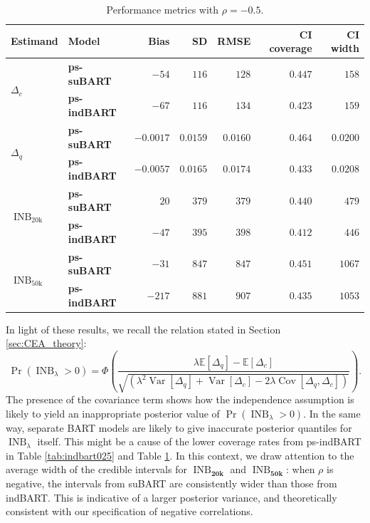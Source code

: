 \documentclass[aoas,preprint]{imsart}
\theoremstyle{plain}
\theoremstyle{definition}
\theoremstyle{remark}
\begin{document}
\begin{appendix}
\begin{table}[H]
\caption{Performance metrics with $\rho = -0.5$.\label{tab:indbart05}}
\setlength{\tabcolsep}{3.75pt}
\begin{tabular}{ll|rrrrr}
\textbf{Estimand} & \textbf{Model} & Bias & SD & RMSE & CI coverage & CI width \\
\hline
\multirow{2}{*}{$\Delta_c$} & \textbf{ps-suBART} & $-54$& $116$& $128$& $0.447$& $158$ \\
 & \textbf{ps-indBART} & $-67$& $116$& $134$& $0.423$& $159$ \\
\multirow{2}{*}{$\Delta_q$} & \textbf{ps-suBART} &$-0.0017$& $0.0159$& $0.0160$& $0.464$& $0.0200$ \\
 & \textbf{ps-indBART} & $-0.0057$& $0.0165$& $0.0174$& $0.433$& $0.0208$\\
\multirow{2}{*}{$\operatorname{INB}_{\mathrm{20k}}$} & \textbf{ps-suBART} & $20$& $379$& $379$& $0.440$& $479$ \\
& \textbf{ps-indBART} & $-47$& $395$& $398$& $0.412$& $446$ \\
\multirow{2}{*}{$\operatorname{INB}_{\mathrm{50k}}$} & \textbf{ps-suBART} & $-31$ & $847$& $847$& $0.451$& $1067$ \\
& \textbf{ps-indBART} & $-217$& $881$& $907$& $0.435$& $1053$
\end{tabular}
\end{table}%
In light of these results, we recall the relation stated in Section \ref{sec:CEA_theory}: 
\[
\Pr\left(\operatorname{INB}_{\lambda} > 0\right) = \Phi \left(\!\frac{\lambda \mathbb{E} \left\lbrack \Delta_q \right\rbrack - \mathbb{E} \left\lbrack \Delta_c \right\rbrack}{\sqrt{\left(\lambda^2 \operatorname{Var}\left\lbrack \Delta_q \right\rbrack + \operatorname{Var}\left\lbrack \Delta_c \right\rbrack - 2 \lambda \operatorname{Cov}\left\lbrack \Delta_q, \Delta_c \right\rbrack \right)}}\!\right).
\]
The presence of the covariance term shows how the independence assumption is likely to yield an inappropriate posterior value of $\Pr\left(\operatorname{INB}_{\lambda} > 0\right)$. In the same way, separate BART models are likely to give inaccurate posterior quantiles for $\operatorname{INB}_{\lambda}$ itself. This might be a cause of the lower coverage rates from ps-indBART in Table \ref{tab:indbart025} and Table \ref{tab:indbart05}.
In this context, we draw attention to the average width of the credible intervals for $\operatorname{INB}_{\mathbf{20k}}$ and $\operatorname{INB}_{\mathbf{50k}}$: when $\rho$ is negative, the intervals from suBART are consistently wider than those from indBART. This is indicative of a larger posterior variance, and theoretically consistent with our specification of negative correlations. 

\end{appendix}
\end{document}
